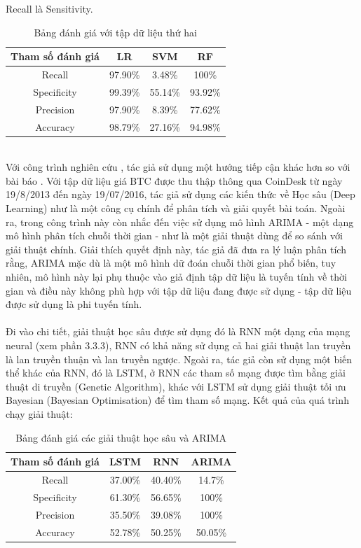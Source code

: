Recall là Sensitivity.
\begin{table}[h]
\centering
\begin{tabular}{ |c|c|c|c| }
\hline
Tham số đánh giá & LR & SVM & RF \\
\hline
Recall & 97.90\% & 3.48\% & 100\% \\
\hline
Specificity & 99.39\% & 55.14\% & 93.92\% \\
\hline
Precision & 97.90\% & 8.39\% & 77.62\% \\
\hline
Accuracy & 98.79\% & 27.16\% & 94.98\% \\
\hline
\end{tabular}
\caption{Bảng đánh giá với tập dữ liệu thứ hai}
\end{table}\\
Với công trình nghiên cứu \cite{PredictingThePriceOfBitcoin}, tác giả sử dụng 
một hướng tiếp cận khác hơn so với bài báo \cite{AutomatedBitcoinTrading}. Với 
tập dữ liệu giá BTC được thu thập thông qua CoinDesk từ ngày 19/8/2013 đến ngày 
19/07/2016, tác giả sử dụng các kiến thức về Học sâu (Deep Learning) như là một 
công cụ chính để phân tích và giải quyết bài toán. Ngoài ra, trong công trình 
này còn nhắc đến việc sử dụng mô hình ARIMA - một dạng mô hình phân tích chuỗi 
thời gian - như là một giải thuật dùng để so sánh với giải thuật chính. Giải 
thích quyết định này, tác giả đã đưa ra lý luận phân tích rằng, ARIMA mặc dù là 
một mô hình dữ đoán chuỗi thời gian phổ biến, tuy nhiên, mô hình này lại phụ 
thuộc vào giả định tập dữ liệu là tuyến tính về thời gian và điều này không phù 
hợp với tập dữ liệu đang được sử dụng - tập dữ liệu được sử dụng là phi tuyến 
tính.\\\\
Đi vào chi tiết, giải thuật học sâu được sử dụng đó là RNN một dạng của 
mạng neural (xem phần 3.3.3), RNN có khả năng sử dụng cả hai giải thuật lan 
truyền là lan truyền thuận và lan truyền ngược. Ngoài ra, tác giả còn sử dụng 
một biến thể khác của RNN, đó là LSTM, ở RNN các tham số mạng được tìm bằng 
giải thuật di truyền (Genetic Algorithm), khác với LSTM sử dụng giải thuật tối 
ưu Bayesian (Bayesian Optimisation) để tìm tham số mạng. Kết quả của quá trình 
chạy giải thuật:
\begin{table}[h]
\centering
\begin{tabular}{ |c|c|c|c| }
\hline
Tham số đánh giá & LSTM & RNN & ARIMA \\
\hline
Recall & 37.00\% & 40.40\% & 14.7\% \\
\hline
Specificity & 61.30\% & 56.65\% & 100\% \\
\hline
Precision & 35.50\% & 39.08\% & 100\% \\
\hline
Accuracy & 52.78\% & 50.25\% & 50.05\% \\
\hline
\end{tabular}
\caption{Bảng đánh giá các giải thuật học sâu và ARIMA}
\end{table}\\
